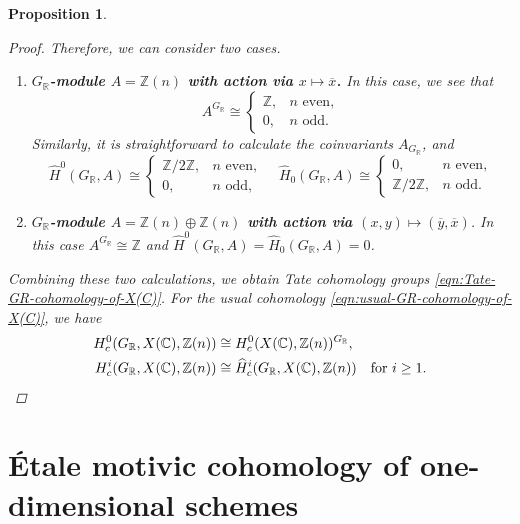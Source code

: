 \documentclass[draft]{article}
\newcommand{\CC}{\mathbb{C}}
\newcommand{\RR}{\mathbb{R}}
\newcommand{\ZZ}{\mathbb{Z}}
\theoremstyle{myplain}
\newtheorem{proposition}[theorem]{Proposition}
\theoremstyle{mydefinition}
\begin{document}
\begin{proposition}
\begin{proof}
    \vspace{1em}

    Therefore, we can consider two cases.
    \begin{enumerate}
    \item[1)] \textbf{$G_\RR$-module $A = \ZZ (n)$ with action via
        $x \mapsto \overline{x}$.}
      In this case, we see that
      \[ A^{G_\RR} \cong
        \begin{cases}
          \ZZ, & n\text{ even}, \\
          0, & n\text{ odd}.
        \end{cases} \]
      Similarly, it is straightforward to calculate the coinvariants
      $A_{G_\RR}$, and
      \[ \widehat{H}^0 (G_\RR, A) \cong
        \begin{cases}
          \ZZ/2\ZZ, & n\text{ even},\\
          0, & n\text{ odd},
        \end{cases} \quad
        \widehat{H}_0 (G_\RR, A) \cong
        \begin{cases}
          0, & n\text{ even},\\
          \ZZ/2\ZZ, & n\text{ odd}.
        \end{cases} \]

    \item[2)] \textbf{$G_\RR$-module $A = \ZZ (n) \oplus \ZZ (n)$ with action
        via $(x,y) \mapsto (\overline{y}, \overline{x})$}. In this case
      $A^{G_\RR} \cong \ZZ$ and
      $\widehat{H}^0 (G_\RR,A) = \widehat{H}_0 (G_\RR,A) = 0$.
    \end{enumerate}

    Combining these two calculations, we obtain Tate cohomology groups
    \eqref{eqn:Tate-GR-cohomology-of-X(C)}. For the usual cohomology
    \eqref{eqn:usual-GR-cohomology-of-X(C)}, we have
    \begin{align*}
      H^0_c (G_\RR, X(\CC), \ZZ (n)) & \cong H^0_c (X(\CC), \ZZ (n))^{G_\RR}, \\
      H^i_c (G_\RR, X(\CC), \ZZ (n)) & \cong \widehat{H}^i_c (G_\RR, X(\CC), \ZZ (n)) \quad \text{for }i \ge 1. \qedhere
    \end{align*}
  \end{proof}
\end{proposition}


\section{\'{E}tale motivic cohomology of one-dimensional schemes}
\label{sec:etale-motivic-cohomology}
\end{document}
